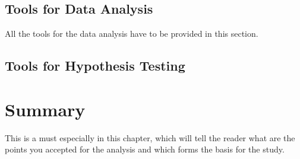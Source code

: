\subsection{Tools for Data Analysis}

All the tools for the data analysis have to be provided in this section.

\subsection{Tools for Hypothesis Testing}

\section{Summary}

This is a must especially in this chapter, which will tell the reader what are the points you accepted for the analysis and which forms the basis for the study.